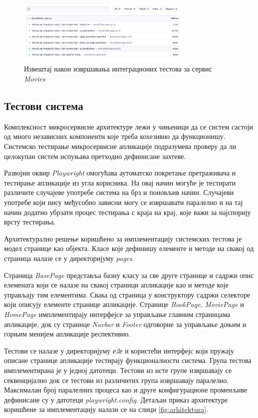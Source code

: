 \documentclass[12pt,oneside]{memoir}
\begin{document}
\begin{figure}[!ht]
  \centering
  \includegraphics[width=0.75\textwidth]{matfmaster/img/integrationReport.png}
  \caption{Извештај након извршавања интеграционих тестова за сервис \textit{Movies}}
  \label{fig:integrationReport}
\end{figure}
\newpage
\subsection{Тестови система}

Комплексност микросервисне архитектуре лежи у чињеници да се систем састоји од много независних компоненти које треба кохезивно да функционишу. Системско тестирање микросервисне апликације подразумева проверу да ли целокупан систем испуњава претходно дефинисане захтеве.

Развојни оквир \textit{Playwright} омогућава аутоматско покретање претраживача и тестирање апликације из угла корисника. На овај начин могуће је тестирати различите случајеве употребе система на брз и поновљив начин. Случајеви употребе који нису међусобно зависни могу се извршавати паралелно и на тај начин додатно убрзати процес тестирања с краја на крај, које важи за најспорију врсту тестирања.

Архитектурално решење коришћено за имплементацију системских тестова  је модел странице као објекта. Класе које дефинишу елементе и методе на свакој од страница налазе се у директоријуму \textit{pages}. 

Страница \textit{BasePage} представља базну класу за све друге странице и садржи опис елемената који се налазе на свакој страници апликације као и методе које управљају тим елементима.  Свака од страница у конструктору садржи селекторе који описују елементе странице апликације. Странице \textit{BookPage}, \textit{MoviePage} и \textit{HomePage} имплементирају интерфејсе за управљање главним страницама апликације, док су странице \textit{Navbar} и \textit{Footer} одговорне за управљање доњим и горњим менијем апликације респективно.

Тестови се налазе у директоријуму \textit{е2е} и користећи интерфејс који пружају описане странице апликације тестирају функционалности система. Група тестова имплементирана је у једној датотеци. Тестови из исте групе извршавају се секвенцијално док се тестови из различитих група извршавају паралелно. Максималан број паралелних процеса као и друге конфигурационе променљиве дефинисане су у датотеци \textit{playwright.config}. Детаљан приказ архитектуре коришћене за имплементацију налази се на слици \ref{fig:arhitektura}.
\end{document}
